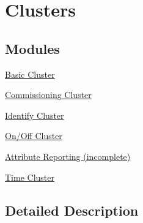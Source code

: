 \hypertarget{group__zcl__clusters}{}\section{Clusters}
\label{group__zcl__clusters}
\subsection*{Modules}
\begin{DoxyCompactItemize}
\item 
\hyperlink{group__zcl__basic}{Basic Cluster}
\item 
\hyperlink{group__zcl__commissioning}{Commissioning Cluster}
\item 
\hyperlink{group__zcl__identify}{Identify Cluster}
\item 
\hyperlink{group__zcl__onoff}{On/\+Off Cluster}
\item 
\hyperlink{group__zcl__reporting}{Attribute Reporting (incomplete)}
\item 
\hyperlink{group__zcl__time}{Time Cluster}
\end{DoxyCompactItemize}


\subsection{Detailed Description}
